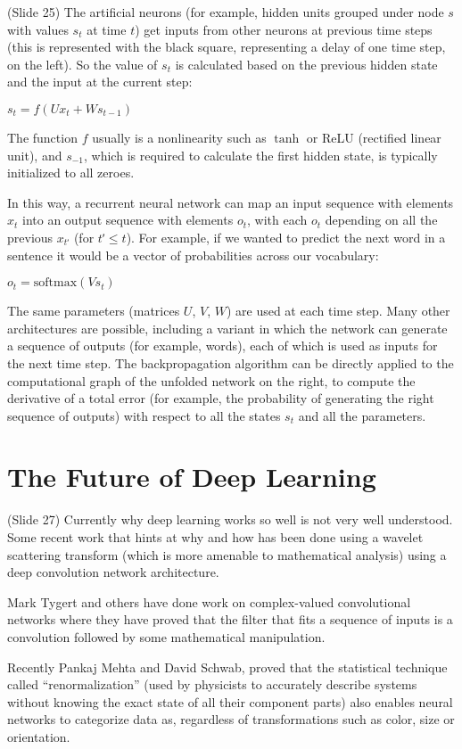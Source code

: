 \documentclass[twocolumn]{article}
\begin{document}
(Slide 25) The artificial neurons (for example, hidden units grouped under node
\(s\) with values \(s_t\) at time \(t\)) get inputs from other neurons at
previous time steps (this is represented with the black square, representing a
delay of one time step, on the left). So the value of \(s_t\) is calculated
based on the previous hidden state and the input at the current step:

\(s_t=f(Ux_t + Ws_{t-1})\)

The function \(f\) usually is a nonlinearity such as \(\tanh\) or ReLU
(rectified linear unit), and \(s_{-1}\), which is required to calculate the
first hidden state, is typically initialized to all zeroes.

In this way, a recurrent neural network can map an input sequence with elements
\(x_t\) into an output sequence with elements \(o_t\), with each \(o_t\)
depending on all the previous \(x_{tʹ}\) (for \(tʹ \leq t\)). For example, if we
wanted to predict the next word in a sentence it would be a vector of
probabilities across our vocabulary:

\( o_t = \mathrm{softmax}(Vs_t)\)

The same parameters (matrices \(U\), \(V\), \(W\)) are used at each time
step. Many other architectures are possible, including a variant in which the
network can generate a sequence of outputs (for example, words), each of which
is used as inputs for the next time step. The backpropagation algorithm can be
directly applied to the computational graph of the unfolded network on the
right, to compute the derivative of a total error (for example, the probability
of generating the right sequence of outputs) with respect to all the states
\(s_t\) and all the parameters.

\section{The Future of Deep Learning}
(Slide 27) Currently why deep learning works so well is not very well
understood. Some recent work that hints at why and how has been done using a
wavelet scattering transform (which is more amenable to mathematical analysis)
using a deep convolution network architecture.

Mark Tygert and others have done work on complex-valued convolutional networks
where they have proved that the filter that fits a sequence of inputs is a
convolution followed by some mathematical manipulation.

Recently Pankaj Mehta and David Schwab, proved that the statistical technique
called ``renormalization''  (used by physicists to accurately describe systems
without knowing the exact state of all their component parts) also enables
neural networks to categorize data as, regardless of transformations such as
color, size or orientation.
\end{document}
